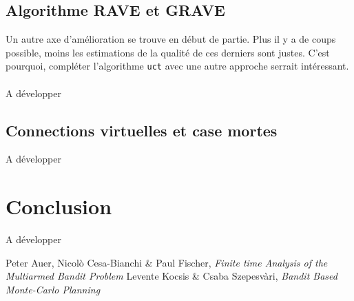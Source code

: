 \documentclass[a4paper]{article}
\theoremstyle{definition}
\begin{document}
\subsection{Algorithme RAVE et GRAVE}

Un autre axe d'amélioration se trouve en début de partie. Plus il y a de coups possible, moins les estimations de la qualité de ces derniers sont justes. C'est pourquoi, compléter l'algorithme \texttt{uct} avec une autre approche serrait intéressant.\\
\\
A développer

\subsection{Connections virtuelles et case mortes}

A développer
\newpage

\section{Conclusion}

A développer

\newpage

\listoffigures 

\newpage

%
\begin{thebibliography}{9}

Peter Auer, Nicol\`o Cesa-Bianchi \& Paul Fischer, {\em Finite time Analysis of the Multiarmed Bandit Problem}
Levente Kocsis \& Csaba Szepesv\`ari, {\em Bandit Based Monte-Carlo Planning}

\end{thebibliography}
\end{document}
